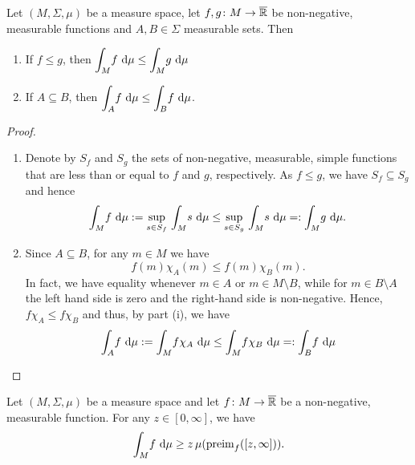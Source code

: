 \begin{lemma}
  \label{lem:intineq}
  Let $(M,\Sigma,\mu)$ be a measure space, let $f,g\colon
  M\to\overline{\mathbb{R}}$ be non-negative, measurable functions and $A,B\in
  \Sigma$ measurable sets. Then
  \begin{enumerate}[label=(\roman*)]
    \item
      If \(f\leq g\), then
      $\displaystyle \int_M\! f\, \mathop{}\!\mathrm{d} \mu \leq \int_M\! g\, \mathop{}\!\mathrm{d} \mu$
    \item
      If \(A\subseteq B\), then
      $\displaystyle \int_A\! f\, \mathop{}\!\mathrm{d} \mu \leq \int_B\! f\, \mathop{}\!\mathrm{d} \mu$.
  \end{enumerate}
\end{lemma}

\begin{proof}
\begin{enumerate}[label=(\roman*)]
\item Denote by $S_f$ and $S_g$ the sets of non-negative, measurable, simple functions that are less than or equal to $f$ and $g$, respectively. As $f\leq g$, we have $S_f\subseteq S_g$ and hence
\begin{equation*}
\int_M\! f\, \d \mu :=  \sup_{s\in S_f}\, \int_M\! s\, \d \mu \leq \sup_{s\in S_g}\, \int_M\! s\, \d \mu =: \int_M\! g\, \d \mu.
\end{equation*}
\item Since $A\subseteq B$, for any $m\in M$ we have
\begin{equation*}
f(m)\chi_A(m) \leq f(m)\chi_B(m).
\end{equation*}
In fact, we have equality whenever $m\in A$ or $m\in M\setminus B$, while for $m\in B\setminus A$ the left hand side is zero and the right-hand side is non-negative. Hence, $f\chi_A\leq f\chi_B$ and thus, by part (i), we have
\begin{equation*}
\int_A\! f\, \d \mu := \int_M\! f\chi_A\, \d \mu \leq\int_M\! f\chi_B\, \d \mu =: \int_B\! f\, \d \mu \qedhere
\end{equation*}
\end{enumerate}
\end{proof}

\begin{proposition}
Let $(M,\Sigma,\mu)$ be a measure space and let $f\colon M\to\overline{\mathbb{R}}$ be a non-negative, measurable function. For any $z\in [0,\infty]$, we have
\begin{equation*}
\int_M\! f\, \mathop{}\!\mathrm{d} \mu \geq z\, \mu(\operatorname{preim}_f([z,\infty])).
\end{equation*}
\end{proposition}

